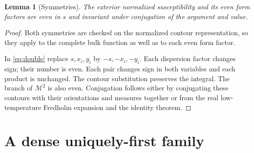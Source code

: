 \documentclass[11pt]{article}
\numberwithin{equation}{section}
\newtheorem{lemma}[theorem]{Lemma}
\theoremstyle{definition}
\newcommand{\M}{\mathcal M}
\begin{document}
\begin{lemma}[Symmetries]\label{lem:symmetry}
The exterior normalized susceptibility and its even form factors are even
in \(s\) and invariant under conjugation of the argument and value.
\end{lemma}
\begin{proof}
Both symmetries are checked on the normalized contour representation, so they apply to the complete bulk function as well as to each even form factor.

In \eqref{eq:double} replace \(s,x_i,y_i\) by \(-s,-x_i,-y_i\).
Each dispersion factor changes sign; their number is even. Each pair
changes sign in both variables and each product is unchanged.
The contour substitution preserves the integral. The branch of \(\M^2\)
is also even. Conjugation follows either by conjugating these contours
with their orientations and measures together or from the real
low-temperature Fredholm expansion and the identity theorem.
\end{proof}



\section{A dense uniquely-first family}
\label{sec:arithmetic}
\end{document}

